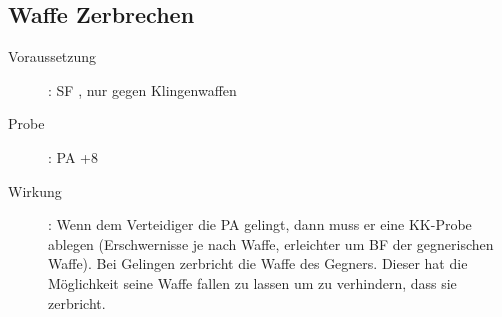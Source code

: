 \subsection{Waffe Zerbrechen}
\label{reaktion.waffe_zerbrechen}
\begin{description}
    \item[Voraussetzung]:
        SF , nur gegen Klingenwaffen
    \item[Probe]:
        PA +8
    \item[Wirkung]:
        Wenn dem Verteidiger die PA gelingt, dann muss er eine KK-Probe ablegen (Erschwernisse je nach Waffe, erleichter um BF der gegnerischen Waffe).
        Bei Gelingen zerbricht die Waffe des Gegners.
        Dieser hat die Möglichkeit seine Waffe fallen zu lassen um zu verhindern, dass sie zerbricht.
\end{description}
